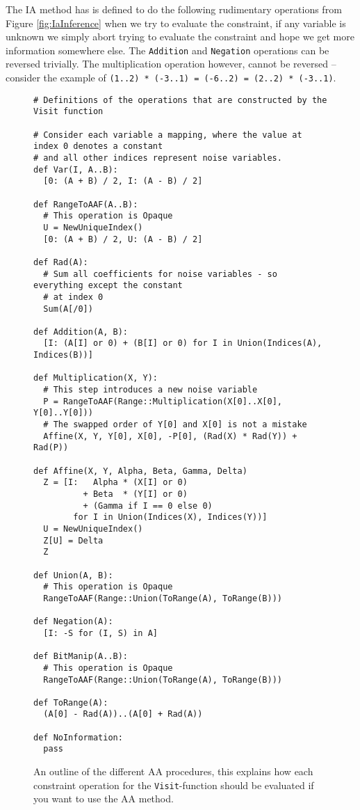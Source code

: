The IA method has is defined to do the following rudimentary operations from Figure \ref{fig:IaInference} when we try to evaluate the constraint, if any variable is unknown we simply abort trying to evaluate the constraint and hope we get more information somewhere else. The \verb+Addition+ and \verb+Negation+ operations can be reversed trivially. The multiplication operation however, cannot be reversed -- consider the example of \verb!(1..2) * (-3..1) = (-6..2) = (2..2) * (-3..1)!.

\begin{figure}[h!]
\begin{verbatim}
# Definitions of the operations that are constructed by the Visit function

# Consider each variable a mapping, where the value at index 0 denotes a constant
# and all other indices represent noise variables.
def Var(I, A..B):
  [0: (A + B) / 2, I: (A - B) / 2]

def RangeToAAF(A..B):
  # This operation is Opaque
  U = NewUniqueIndex()
  [0: (A + B) / 2, U: (A - B) / 2]

def Rad(A):
  # Sum all coefficients for noise variables - so everything except the constant
  # at index 0
  Sum(A[/0])

def Addition(A, B):
  [I: (A[I] or 0) + (B[I] or 0) for I in Union(Indices(A), Indices(B))]

def Multiplication(X, Y):
  # This step introduces a new noise variable
  P = RangeToAAF(Range::Multiplication(X[0]..X[0], Y[0]..Y[0]))
  # The swapped order of Y[0] and X[0] is not a mistake
  Affine(X, Y, Y[0], X[0], -P[0], (Rad(X) * Rad(Y)) + Rad(P))

def Affine(X, Y, Alpha, Beta, Gamma, Delta)
  Z = [I:   Alpha * (X[I] or 0)
          + Beta  * (Y[I] or 0)
          + (Gamma if I == 0 else 0)
        for I in Union(Indices(X), Indices(Y))]
  U = NewUniqueIndex()
  Z[U] = Delta
  Z

def Union(A, B):
  # This operation is Opaque
  RangeToAAF(Range::Union(ToRange(A), ToRange(B)))
  
def Negation(A):
  [I: -S for (I, S) in A]

def BitManip(A..B):
  # This operation is Opaque
  RangeToAAF(Range::Union(ToRange(A), ToRange(B)))

def ToRange(A):
  (A[0] - Rad(A))..(A[0] + Rad(A))

def NoInformation:
  pass

\end{verbatim}
  \cprotect\caption{An outline of the different AA procedures, this explains how each constraint operation for the \verb+Visit+-function should be evaluated if you want to use the AA method.}
\label{fig:AaInference}
\end{figure}

